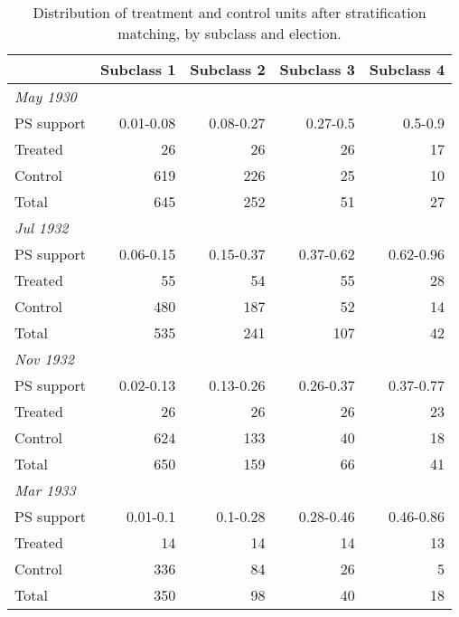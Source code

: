 \begin{table}[h!]
\centering
\caption{Distribution of treatment and control units after stratification matching, by subclass and election.\label{tab:subclassdist}} 
\begingroup\scriptsize
\begin{tabular}{lrrrr}
  \toprule
 & Subclass 1 & Subclass 2 & Subclass 3 & Subclass 4 \\ 
  \midrule
\textit{May 1930} &  &  &  &  \\ 
  PS support & 0.01-0.08 & 0.08-0.27 & 0.27-0.5 & 0.5-0.9 \\ 
  Treated & 26 & 26 & 26 & 17 \\ 
  Control & 619 & 226 & 25 & 10 \\ 
  Total & 645 & 252 & 51 & 27 \\ 
  \textit{Jul 1932} &  &  &  &  \\ 
  PS support & 0.06-0.15 & 0.15-0.37 & 0.37-0.62 & 0.62-0.96 \\ 
  Treated & 55 & 54 & 55 & 28 \\ 
  Control & 480 & 187 & 52 & 14 \\ 
  Total & 535 & 241 & 107 & 42 \\ 
  \textit{Nov 1932} &  &  &  &  \\ 
  PS support & 0.02-0.13 & 0.13-0.26 & 0.26-0.37 & 0.37-0.77 \\ 
  Treated & 26 & 26 & 26 & 23 \\ 
  Control & 624 & 133 & 40 & 18 \\ 
  Total & 650 & 159 & 66 & 41 \\ 
  \textit{Mar 1933} &  &  &  &  \\ 
  PS support & 0.01-0.1 & 0.1-0.28 & 0.28-0.46 & 0.46-0.86 \\ 
  Treated & 14 & 14 & 14 & 13 \\ 
  Control & 336 & 84 & 26 & 5 \\ 
  Total & 350 & 98 & 40 & 18 \\ 
   \bottomrule
\end{tabular}
\endgroup
\end{table}
